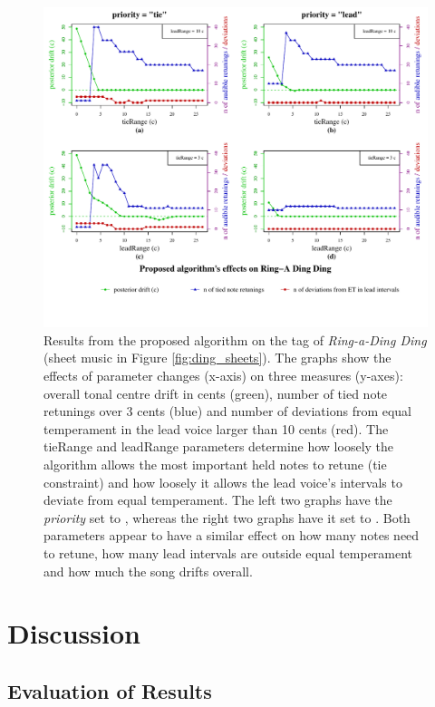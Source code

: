 \documentclass[a4paper]{article}
\begin{document}
\begin{figure}
	\centering
	\includegraphics[width=\linewidth]{Results/effects_ring.pdf}
	\caption{Results from the proposed algorithm on the tag of \textit{Ring-a-Ding Ding} (sheet music in Figure \ref{fig:ding_sheets}). The graphs show the effects of parameter changes (x-axis) on three measures (y-axes): overall tonal centre drift in cents (green), number of tied note retunings over 3 cents (blue) and number of deviations from equal temperament in the lead voice larger than 10 cents (red). The tieRange and leadRange parameters determine how loosely the algorithm allows the most important held notes to retune (tie constraint) and how loosely it allows the lead voice's intervals to deviate from equal temperament. The left two graphs have the \textit{priority} set to , whereas the right two graphs have it set to . Both parameters appear to have a similar effect on how many notes need to retune, how many lead intervals are outside equal temperament and how much the song drifts overall.}
	\label{fig:results}
\end{figure}

\section{Discussion}
\label{discussion}
\subsection{Evaluation of Results}
\end{document}
